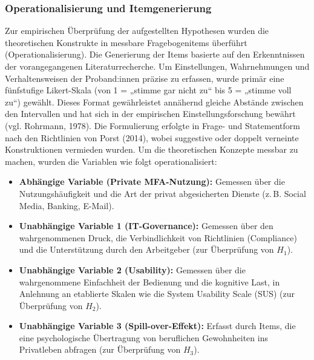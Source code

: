\subsubsection{Operationalisierung und Itemgenerierung} %
Zur empirischen Überprüfung der aufgestellten Hypothesen wurden die theoretischen Konstrukte in messbare Fragebogenitems überführt (Operationalisierung). Die Generierung der Items basierte auf den Erkenntnissen der vorangegangenen Literaturrecherche. Um Einstellungen, Wahrnehmungen und Verhaltensweisen der Proband:innen präzise zu erfassen, wurde primär eine fünfstufige Likert-Skala (von 1 = „stimme gar nicht zu“ bis 5 = „stimme voll zu“) gewählt. Dieses Format gewährleistet annähernd gleiche Abstände zwischen den Intervallen und hat sich in der empirischen Einstellungsforschung bewährt (vgl. Rohrmann, 1978). Die Formulierung erfolgte in Frage- und Statementform nach den Richtlinien von Porst (2014), wobei suggestive oder doppelt verneinte Konstruktionen vermieden wurden.
Um die theoretischen Konzepte messbar zu machen, wurden die Variablen wie folgt operationalisiert:
\begin{itemize}
    \item \textbf{Abhängige Variable (Private MFA-Nutzung):} Gemessen über die Nutzungshäufigkeit und die Art der privat abgesicherten Dienste (z.\,B. Social Media, Banking, E-Mail).
    \item \textbf{Unabhängige Variable 1 (IT-Governance):} Gemessen über den wahrgenommenen Druck, die Verbindlichkeit von Richtlinien (Compliance) und die Unterstützung durch den Arbeitgeber (zur Überprüfung von $H_1$).
    \item \textbf{Unabhängige Variable 2 (Usability):} Gemessen über die wahrgenommene Einfachheit der Bedienung und die kognitive Last, in Anlehnung an etablierte Skalen wie die System Usability Scale (SUS) (zur Überprüfung von $H_2$).
    \item \textbf{Unabhängige Variable 3 (Spill-over-Effekt):} Erfasst durch Items, die eine psychologische Übertragung von beruflichen Gewohnheiten ins Privatleben abfragen (zur Überprüfung von $H_3$).
\end{itemize}

